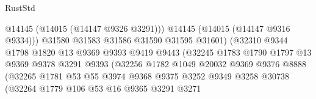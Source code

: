 \begin{lexlean}{RustStd}
\begin{coremodule}
                                          @14145
                                          (@14015 (@14147 @9326 @3291)))
                                        @14145
                                        (@14015 (@14147 @9316 @9334)))
                                      @31580
                                      @31583
                                      @31586
                                      @31590
                                      @31595
                                      @31601)
                                    (@32310
                                      @9344
                                      @1798
                                      @1820
                                      @13
                                      @9369
                                      @9393
                                      @9419
                                      @9443
                                      (@32245
                                        @1783
                                        @1790
                                        @1797
                                        @13
                                        @9369
                                        @9378
                                        @3291
                                        @9393
                                        (@32256
                                          @1782
                                          @1049
                                          @20032
                                          @9369
                                          @9376
                                          @8888
                                          (@32265
                                            @1781
                                            @53
                                            @55
                                            @3974
                                            @9368
                                            @9375
                                            @3252
                                            @9349
                                            @3258
                                            @30738
                                            (@32264
                                              @1779
                                              @106
                                              @53
                                              @16
                                              @9365
                                              @3291
                                              @3271

\end{coremodule}
\end{lexlean}
